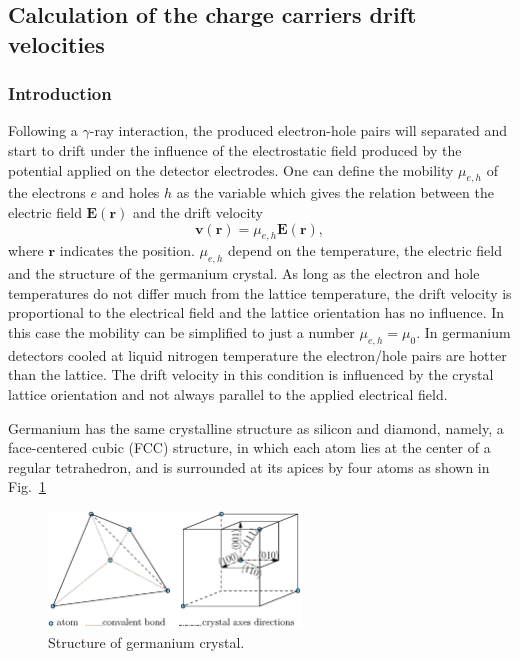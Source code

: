 \subsection{Calculation of the charge carriers drift velocities}
\label{sec:drift}

\subsubsection{Introduction}
\label{sec:drin}
Following a $\gamma$-ray interaction, the produced electron-hole pairs
will separated and start to drift under the influence of the
electrostatic field produced by the potential applied on the detector
electrodes. One can define the mobility $\mu_{e,h}$ of the electrons
$e$ and holes $h$ as the variable which gives the relation between the
electric field $\mathbf{E}(\mathbf{r})$ and the drift velocity
\begin{equation}
  \label{eq:mobi}
  \mathbf{v}(\mathbf{r}) = \mu_{e,h} \mathbf{E}(\mathbf{r}),
\end{equation}
where $\mathbf{r}$ indicates the position. $\mu_{e,h}$ depend on the
temperature, the electric field and the structure of the germanium
crystal. As long as the electron and hole temperatures do not differ
much from the lattice temperature, the drift velocity is proportional
to the electrical field and the lattice orientation has no influence.
In this case the mobility can be simplified to just a number
$\mu_{e,h} = \mu_{0}$. In germanium detectors cooled at liquid
nitrogen temperature the electron/hole pairs are hotter than the
lattice. The drift velocity in this condition is influenced by the
crystal lattice orientation and not always parallel to the applied
electrical field.

Germanium has the same crystalline structure as silicon and diamond, namely, a face-centered cubic (FCC) structure, in which each atom lies at the center of a regular tetrahedron, and is surrounded at its apices by four atoms as shown in Fig.~\ref{fig:xtal}
\begin{figure}[tbhp]
  \centering
  \includegraphics[width=0.6\textwidth]{xtalStruc.eps}  
  \caption{Structure of germanium crystal.}
  \label{fig:xtal}
\end{figure}

